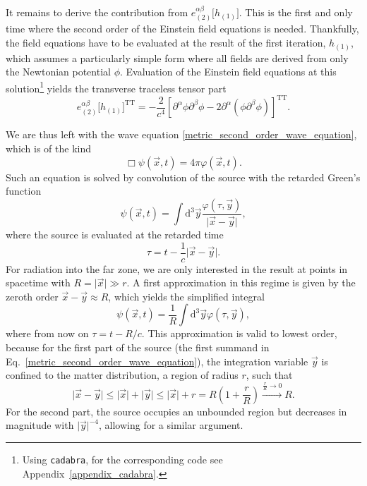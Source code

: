 It remains to derive the contribution from $e^{\alpha\beta}_{(2)}\lbrack h_{(1)}\rbrack$. This is the first and only time where the second order of the Einstein field equations is needed. Thankfully, the field equations have to be evaluated at the result of the first iteration, $h_{(1)}$, which assumes a particularly simple form where all fields are derived from only the Newtonian potential $\phi$. Evaluation of the Einstein field equations at this solution\footnote{Using \texttt{cadabra}, for the corresponding code see Appendix~\ref{appendix_cadabra}.} yields the transverse traceless tensor part
\begin{equation}
  e^{\alpha\beta}_{(2)}\lbrack h_{(1)}\rbrack^\text{TT} = -\frac{2}{c^4}\left\lbrack\partial^\alpha\phi\partial^\beta\phi - 2\partial^\alpha(\phi\partial^\beta\phi) \right\rbrack^\text{TT}.
\end{equation}

We are thus left with the wave equation \eqref{metric_second_order_wave_equation}, which is of the kind
\begin{equation}
  \Box\psi(\vec x,t) = 4\pi\varphi(\vec x,t).
\end{equation}
Such an equation is solved by convolution of the source with the retarded Green's function \cite{}
\begin{equation}
  \psi(\vec x,t) = \int\mathrm d^3\vec y\frac{\varphi(\tau,\vec y)}{\lvert\vec x-\vec y\rvert},
\end{equation}
where the source is evaluated at the retarded time
\begin{equation}
  \tau = t - \frac{1}{c}\lvert\vec x-\vec y\rvert.
\end{equation}
For radiation into the far zone, we are only interested in the result at points in spacetime with $R=\lvert\vec x\rvert\gg r$. A first approximation in this regime is given by the zeroth order $\vec x - \vec y \approx R$, which yields the simplified integral
\begin{equation}
  \psi(\vec x,t) = \frac{1}{R}\int\mathrm d^3\vec y\varphi(\tau,\vec y),
\end{equation}
where from now on $\tau = t-R/c$. This approximation is valid to lowest order, because for the first part of the source (the first summand in Eq.~\eqref{metric_second_order_wave_equation}), the integration variable $\vec y$ is confined to the matter distribution, a region of radius $r$, such that
\begin{equation}
  \lvert\vec x-\vec y\rvert \leq \lvert\vec x\rvert + \lvert\vec y\rvert \leq \lvert\vec x\rvert + r = R(1 + \frac{r}{R}) \xrightarrow{\frac{r}{R}\to 0} R.
\end{equation}
For the second part, the source occupies an unbounded region but decreases in magnitude with $\lvert\vec y\rvert^{-4}$, allowing for a similar argument.

